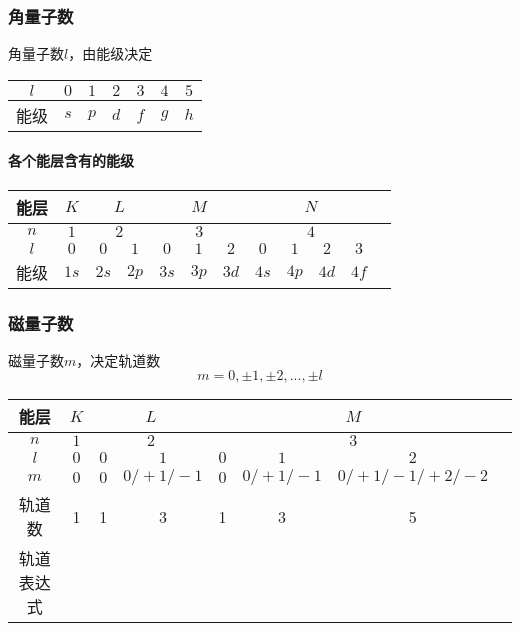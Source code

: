 \documentclass[a4paper]{article}
\begin{document}
	\subsubsection{角量子数}
	角量子数$l$，由能级决定
	\begin{center}
	\begin{tabular}{|c|c|c|c|c|c|c|}
		\hline
		$l$ & $0$ & $1$ & $2$ & $3$ & $4$ & $5$\\\hline
		能级 & $s$ & $p$ & $d$ & $f$ & $g$ & $h$\\\hline
	\end{tabular}
	\end{center}
	\paragraph{各个能层含有的能级}
	\begin{center}
	\begin{tabular}{|c|c|c|c|c|c|c|c|c|c|c|c|}
		\hline
		能层 & $K$ & \multicolumn{2}{c|}{$L$} & \multicolumn{3}{c|}{$M$} & \multicolumn{4}{c|}{$N$}\\\hline
		$n$ & $1$ & \multicolumn{2}{c|}{$2$} & \multicolumn{3}{c|}{$3$} & \multicolumn{4}{c|}{$4$}\\\hline
		$l$ & $0$ & $0$ & $1$ & $0$ & $1$ & $2$ & $0$ & $1$ & $2$ & $3$\\\hline
		能级 & $1s$ & $2s$ & $2p$ & $3s$ & $3p$ & $3d$ & $4s$ & $4p$ & $4d$ & $4f$\\\hline
	\end{tabular}
	\end{center}
	\subsubsection{磁量子数}
	磁量子数$m$，决定轨道数
	$$m=0,\pm1,\pm2,...,\pm l$$
	\begin{center}
	\begin{tabular}{|c|c|c|c|c|c|c|c|}
		\hline
		能层 & $K$ & \multicolumn{2}{c|}{$L$} & \multicolumn{3}{c|}{$M$}\\\hline
		$n$ & $1$ & \multicolumn{2}{c|}{$2$} & \multicolumn{3}{c|}{$3$}\\\hline
		$l$ & $0$ & $0$ & $1$ & $0$ & $1$ & $2$\\\hline
		$m$ & $0$ & $0$ & $0/+1/-1$ & $0$ & $0/+1/-1$ & $0/+1/-1/+2/-2$\\\hline
		轨道数 & 1 & 1 & 3 & 1 & 3 & 5\\\hline
		轨道表达式 & \fbox{$\ \ $} & \fbox{$\ \ $} & \fbox{$\ \ $}\fbox{$\ \ $}\fbox{$\ \ $} & \fbox{$\ \ $} & \fbox{$\ \ $}\fbox{$\ \ $}\fbox{$\ \ $} & \fbox{$\ \ $}\fbox{$\ \ $}\fbox{$\ \ $}\fbox{$\ \ $}\fbox{$\ \ $}\\\hline
	\end{tabular}
	\end{center}
\end{document}
